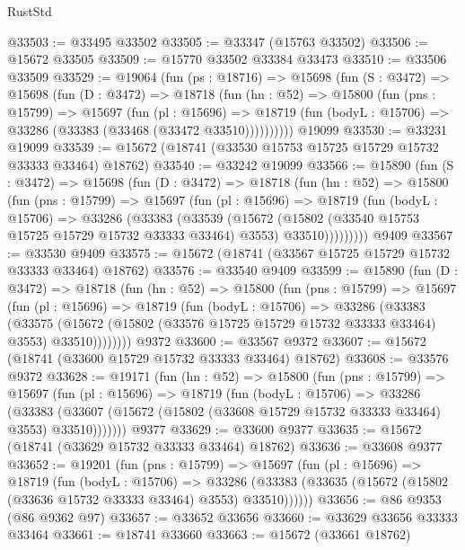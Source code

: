 \begin{lexlean}{RustStd}
\begin{coremodule}
@33503 := @33495 @33502
@33505 := @33347 (@15763 @33502)
@33506 := @15672 @33505
@33509 := @15770 @33502 @33384 @33473
@33510 := @33506 @33509
@33529 := @19064
    (fun (ps : @18716) =>
    @15698
      (fun (S : @3472) =>
      @15698
        (fun (D : @3472) =>
        @18718
          (fun (hn : @52) =>
          @15800
            (fun (pns : @15799) =>
            @15697
              (fun (pl : @15696) =>
              @18719 (fun (bodyL : @15706) => @33286 (@33383 (@33468 (@33472 @33510))))))))))
    @19099
@33530 := @33231 @19099
@33539 := @15672 (@18741 (@33530 @15753 @15725 @15729 @15732 @33333 @33464) @18762)
@33540 := @33242 @19099
@33566 := @15890
    (fun (S : @3472) =>
    @15698
      (fun (D : @3472) =>
      @18718
        (fun (hn : @52) =>
        @15800
          (fun (pns : @15799) =>
          @15697
            (fun (pl : @15696) =>
            @18719
              (fun (bodyL : @15706) =>
              @33286
                (@33383
                  (@33539
                    (@15672
                      (@15802 (@33540 @15753 @15725 @15729 @15732 @33333 @33464) @3553)
                      @33510)))))))))
    @9409
@33567 := @33530 @9409
@33575 := @15672 (@18741 (@33567 @15725 @15729 @15732 @33333 @33464) @18762)
@33576 := @33540 @9409
@33599 := @15890
    (fun (D : @3472) =>
    @18718
      (fun (hn : @52) =>
      @15800
        (fun (pns : @15799) =>
        @15697
          (fun (pl : @15696) =>
          @18719
            (fun (bodyL : @15706) =>
            @33286
              (@33383
                (@33575
                  (@15672 (@15802 (@33576 @15725 @15729 @15732 @33333 @33464) @3553) @33510))))))))
    @9372
@33600 := @33567 @9372
@33607 := @15672 (@18741 (@33600 @15729 @15732 @33333 @33464) @18762)
@33608 := @33576 @9372
@33628 := @19171
    (fun (hn : @52) =>
    @15800
      (fun (pns : @15799) =>
      @15697
        (fun (pl : @15696) =>
        @18719
          (fun (bodyL : @15706) =>
          @33286
            (@33383
              (@33607 (@15672 (@15802 (@33608 @15729 @15732 @33333 @33464) @3553) @33510)))))))
    @9377
@33629 := @33600 @9377
@33635 := @15672 (@18741 (@33629 @15732 @33333 @33464) @18762)
@33636 := @33608 @9377
@33652 := @19201
    (fun (pns : @15799) =>
    @15697
      (fun (pl : @15696) =>
      @18719
        (fun (bodyL : @15706) =>
        @33286 (@33383 (@33635 (@15672 (@15802 (@33636 @15732 @33333 @33464) @3553) @33510))))))
@33656 := @86 @9353 (@86 @9362 @97)
@33657 := @33652 @33656
@33660 := @33629 @33656 @33333 @33464
@33661 := @18741 @33660
@33663 := @15672 (@33661 @18762)

\end{coremodule}
\end{lexlean}
